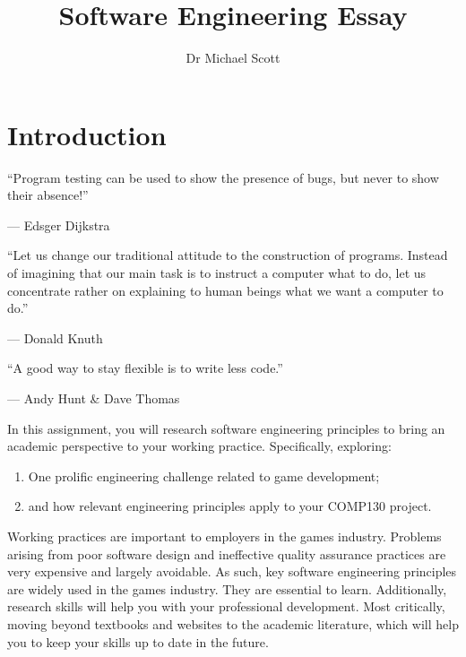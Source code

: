 \documentclass{../../fal_assignment}
\title{Software Engineering Essay}
\author{Dr Michael Scott}
\begin{document}
\maketitle

\section*{Introduction}

\begin{marginquote}
  ``Program testing can be used to show the presence of bugs, but never to show their absence!''
  
   --- Edsger Dijkstra
   
    \marginquoterule
    
    ``Let us change our traditional attitude to the construction of programs. Instead of imagining that our main task is to instruct a computer what to do, let us concentrate rather on explaining to human beings what we want a computer to do.''
    
    --- Donald Knuth
    
    \marginquoterule
    
    ``A good way to stay flexible is to write less code.''
    
    --- Andy Hunt \& Dave Thomas
      
\end{marginquote}

In this assignment, you will research software engineering principles to bring an academic perspective to your working practice. Specifically, exploring: 

\begin{enumerate}[label=(\roman*)]
    \item One prolific engineering challenge related to game development;
    \item and how relevant engineering principles apply to your COMP130 project.
\end{enumerate}

Working practices are important to employers in the games industry. Problems arising from poor software design and ineffective quality assurance practices are very expensive and largely avoidable. As such, key software engineering principles are widely used in the games industry. They are essential to learn. Additionally, research skills will help you with your professional development. Most critically, moving beyond textbooks and websites to the academic literature, which will help you to keep your skills up to date in the future.
\end{document}
